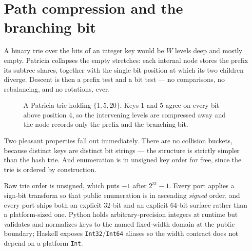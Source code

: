 \documentclass[11pt,twoside,openright]{book}
\newcommand{\code}[1]{\texorpdfstring{\textcolor{d7ink}{\texttt{#1}}}{#1}}
\begin{document}
\section{Path compression and the branching bit}

A binary trie over the bits of an integer key would be $W$ levels deep and
mostly empty. Patricia collapses the empty stretches: each internal node stores
the prefix its subtree shares, together with the single bit position at which
its two children diverge. Descent is then a prefix test and a bit test ---
no comparisons, no rebalancing, and no rotations, ever.

\begin{figure}[htbp]
\centering
{}
\caption{A Patricia trie holding $\{1, 5, 20\}$. Keys 1 and 5 agree on every bit
above position 4, so the intervening levels are compressed away and the node
records only the prefix and the branching bit.}
\label{fig:patricia}
\end{figure}

Two pleasant properties fall out immediately. There are no collision buckets,
because distinct keys are distinct bit strings --- the structure is strictly
simpler than the hash trie. And enumeration is in unsigned key order for free,
since the trie is ordered by construction.

\begin{contractbox}
Raw trie order is unsigned, which puts $-1$ after $2^{31}-1$. Every port applies
a sign-bit transform so that public enumeration is in ascending \emph{signed}
order, and every port ships both an explicit 32-bit and an explicit 64-bit
surface rather than a platform-sized one. Python holds arbitrary-precision
integers at runtime but validates and normalizes keys to the named fixed-width
domain at the public boundary; Haskell exposes \code{Int32}/\code{Int64} aliases
so the width contract does not depend on a platform \code{Int}.
\end{contractbox}
\end{document}
